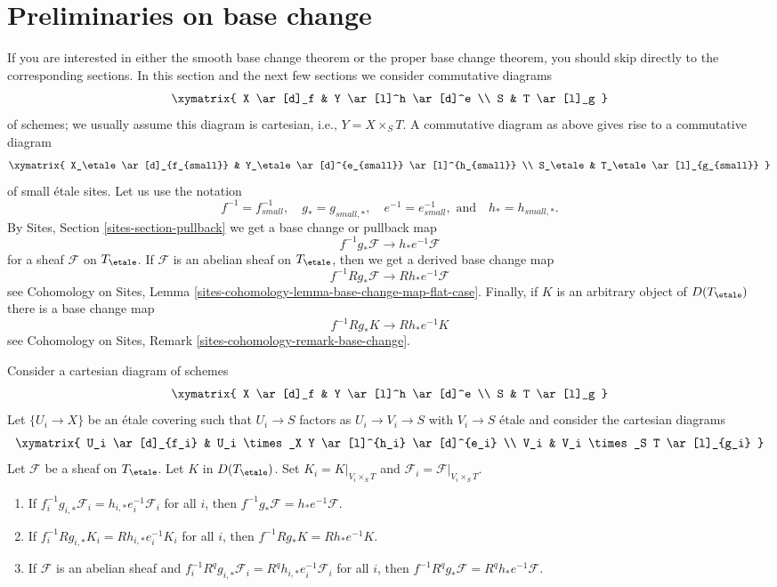 \section{Preliminaries on base change}
\label{section-base-change-preliminaries}

\noindent
If you are interested in either the smooth base change theorem
or the proper base change theorem, you should skip directly to
the corresponding sections.
In this section and the next few sections we consider commutative diagrams
$$
\xymatrix{
X \ar[d]_f & Y \ar[l]^h \ar[d]^e \\
S & T \ar[l]_g
}
$$
of schemes; we usually assume this diagram is cartesian,
i.e., $Y = X \times_S T$. A commutative diagram as above
gives rise to a commutative diagram
$$
\xymatrix{
X_\etale \ar[d]_{f_{small}} & Y_\etale \ar[d]^{e_{small}} \ar[l]^{h_{small}} \\
S_\etale & T_\etale \ar[l]_{g_{small}}
}
$$
of small \'etale sites. Let us use the notation
$$
f^{-1} = f_{small}^{-1}, \quad
g_* = g_{small, *}, \quad
e^{-1} = e_{small}^{-1}, \text{ and}\quad
h_* = h_{small, *}.
$$
By Sites, Section \ref{sites-section-pullback}
we get a base change or pullback map
$$
f^{-1}g_*\mathcal{F}
\longrightarrow
h_*e^{-1}\mathcal{F}
$$
for a sheaf $\mathcal{F}$ on $T_\etale$. If $\mathcal{F}$ is an abelian
sheaf on $T_\etale$, then we get a derived base change map
$$
f^{-1}Rg_*\mathcal{F}
\longrightarrow
Rh_*e^{-1}\mathcal{F}
$$
see Cohomology on Sites, Lemma
\ref{sites-cohomology-lemma-base-change-map-flat-case}.
Finally, if $K$ is an arbitrary object of $D(T_\etale)$
there is a base change map
$$
f^{-1}Rg_*K
\longrightarrow
Rh_*e^{-1}K
$$
see
Cohomology on Sites, Remark \ref{sites-cohomology-remark-base-change}.

\begin{lemma}
\label{lemma-base-change-local}
Consider a cartesian diagram of schemes
$$
\xymatrix{
X \ar[d]_f & Y \ar[l]^h \ar[d]^e \\
S & T \ar[l]_g
}
$$
Let $\{U_i \to X\}$ be an \'etale covering such that $U_i \to S$
factors as $U_i \to V_i \to S$ with $V_i \to S$ \'etale
and consider the cartesian diagrams
$$
\xymatrix{
U_i \ar[d]_{f_i} & U_i \times_X Y \ar[l]^{h_i} \ar[d]^{e_i} \\
V_i & V_i \times_S T \ar[l]_{g_i}
}
$$
Let $\mathcal{F}$ be a sheaf on $T_\etale$. Let $K$ in $D(T_\etale)$.
Set $K_i = K|_{V_i \times_S T}$ and
$\mathcal{F}_i = \mathcal{F}|_{V_i \times_S T}$.
\begin{enumerate}
\item If $f_i^{-1}g_{i, *}\mathcal{F}_i = h_{i, *}e_i^{-1}\mathcal{F}_i$
for all $i$, then $f^{-1}g_*\mathcal{F} = h_*e^{-1}\mathcal{F}$.
\item If $f_i^{-1}Rg_{i, *}K_i = Rh_{i, *}e_i^{-1}K_i$
for all $i$, then $f^{-1}Rg_*K = Rh_*e^{-1}K$.
\item If $\mathcal{F}$ is an abelian sheaf and
$f_i^{-1}R^qg_{i, *}\mathcal{F}_i = R^qh_{i, *}e_i^{-1}\mathcal{F}_i$
for all $i$, then
$f^{-1}R^qg_*\mathcal{F} = R^qh_*e^{-1}\mathcal{F}$.
\end{enumerate}
\end{lemma}

